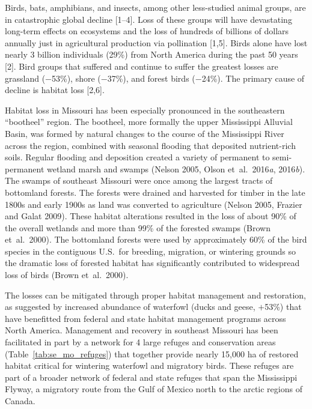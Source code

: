 \documentclass[12pt]{article}
\begin{document}
\newpage

\doublespacing


Birds, bats, amphibians, and insects, among other less-studied animal groups, are in catastrophic global decline [1–4]. Loss of these groups will have devastating long-term effects on ecosystems and the loss of hundreds of billions of dollars annually just in agricultural production via pollination [1,5]. Birds alone have lost nearly 3 billion individuals (29\%) from North America during the past 50 years [2]. Bird groups that suffered and continue to suffer the greatest losses are grassland ($-$53\%), shore ($-$37\%), and forest birds ($-$24\%). The primary cause of decline is habitat loss [2,6]. 

Habitat loss in Missouri has been especially pronounced in the southeastern “bootheel” region. The bootheel, more formally the upper Mississippi Alluvial Basin, was formed by natural changes to the course of the Mississippi River across the region, combined with seasonal flooding that deposited nutrient-rich soils.  Regular flooding and deposition created a variety of permanent to semi-permanent wetland marsh and swamps (Nelson 2005, Olson et~al.~2016\textit{a}, 2016\textit{b}). The swamps of southeast Missouri were once among the largest tracts of bottomland forests. The forests were drained and harvested for timber in the late 1800s and early 1900s as land was converted to agriculture (Nelson 2005, Frazier and Galat 2009). These habitat alterations resulted in the loss of about 90\% of the overall wetlands and more than 99\% of the forested swamps (Brown et~al.~2000).  The bottomland forests were used by approximately 60\% of the bird species in the contiguous U.S.~for breeding, migration, or wintering grounds so the dramatic loss of forested habitat has significantly contributed to widespread loss of birds (Brown et~al.~2000).


The losses can be mitigated through proper habitat management and restoration, as suggested by increased abundance of waterfowl (ducks and geese, $+$53\%) that have benefitted from federal and state habitat management programs across North America.  Management and recovery in southeast Missouri has been facilitated in part by a network for 4 large refuges and conservation areas (Table~\ref*{tab:se_mo_refuges}) that together provide nearly 15,000 ha of restored habitat critical for wintering waterfowl and migratory birds. These refuges are part of a broader network of federal and state refuges that span the Mississippi Flyway, a migratory route from the Gulf of Mexico north to the arctic regions of Canada. 
\end{document}

